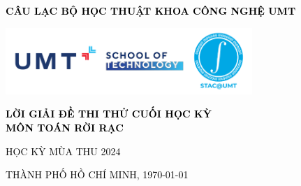 \begin{titlepage}
    \thispagestyle{empty}
    \begin{center}
      \fontsize{12}{8}\selectfont {}       

      \fontsize{12}{8}\selectfont {} 

      \fontsize{12}{8}\selectfont \textbf{\textcolor{black}{CÂU LẠC BỘ HỌC THUẬT KHOA CÔNG NGHỆ UMT}}

      \includegraphics[width=0.7\textwidth]{Resources/Logos/UMT_SOT_STAC.png}
        
      \vspace*{5cm}
                
      \textbf{\fontsize{20}{15}\selectfont \textcolor{black}{LỜI GIẢI ĐỀ THI THỬ CUỐI HỌC KỲ\\MÔN TOÁN RỜI RẠC}}

      \Large
      \textcolor{black}{HỌC KỲ MÙA THU 2024}
                

        \vspace*{\fill}                
        \textcolor{black}{\MakeUppercase{\fontsize{12}{8}\selectfont THÀNH PHỐ HỒ CHÍ MINH, \today}}
                
    \end{center}
\end{titlepage}
\newpage

